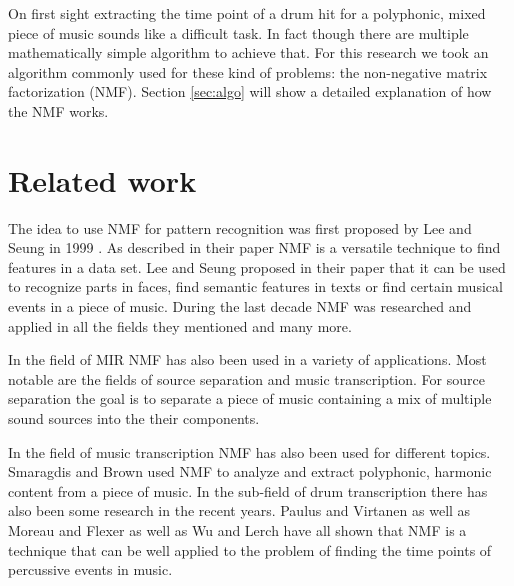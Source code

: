 \documentclass{article}
\begin{document}
On first sight extracting the time point of a drum hit for a polyphonic, mixed piece of music sounds like a difficult task.
In fact though there are multiple mathematically simple algorithm to achieve that.
For this research we took an algorithm commonly used for these kind of problems: the non-negative matrix factorization (NMF).
Section \ref{sec:algo} will show a detailed explanation of how the NMF works.






\section{Related work}
\label{sec:rel}

The idea to use NMF for pattern recognition was first proposed by Lee and Seung in 1999 \cite{lee1999}.
As described in their paper NMF is a versatile technique to find features in a data set.
Lee and Seung proposed in their paper that it can be used to recognize parts in faces, find semantic features in texts or find certain musical events in a piece of music.
During the last decade NMF was researched and applied in all the fields they mentioned and many more.

In the field of MIR NMF has also been used in a variety of applications.
Most notable are the fields of source separation and music transcription.
For source separation the goal is to separate a piece of music containing a mix of multiple sound sources into the their components.
\cite{virtanen2007}

In the field of music transcription NMF has also been used for different topics.
Smaragdis and Brown \cite{smaragdis2003} used NMF to analyze and extract polyphonic, harmonic content from a piece of music.
In the sub-field of drum transcription there has also been some research in the recent years.
Paulus and Virtanen \cite{paulus2005} as well as Moreau and Flexer \cite{moreau2007} as well as Wu and Lerch \cite{wu2015} have all shown that NMF is a technique that can be well applied to the problem of finding the time points of percussive events in music.
\end{document}
